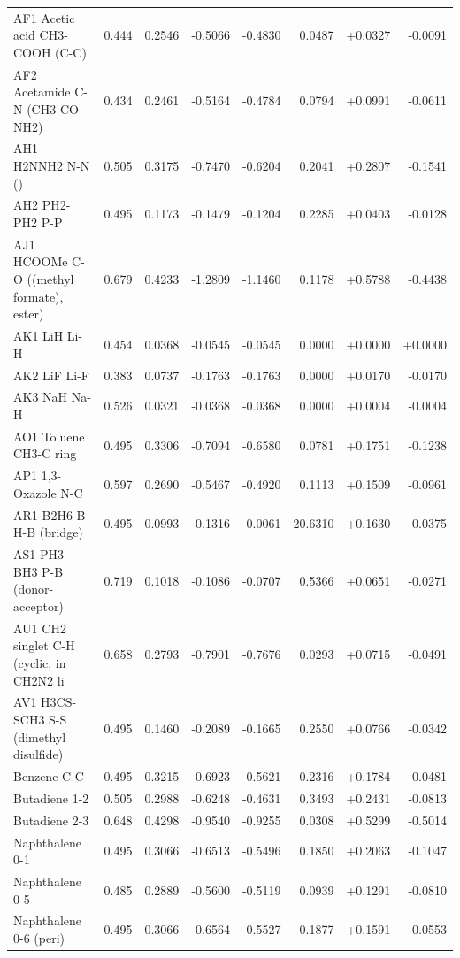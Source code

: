 \documentclass[11pt,a4paper]{article}
\begin{document}
\begin{longtable}{p{4.5cm}rrrrrrr}
AF1 Acetic acid CH3-COOH (C-C) & 0.444 & 0.2546 & -0.5066 & -0.4830 & 0.0487 & +0.0327 & -0.0091\\
AF2 Acetamide C-N (CH3-CO-NH2) & 0.434 & 0.2461 & -0.5164 & -0.4784 & 0.0794 & +0.0991 & -0.0611\\
AH1 H2NNH2 N-N () & 0.505 & 0.3175 & -0.7470 & -0.6204 & 0.2041 & +0.2807 & -0.1541\\
AH2 PH2-PH2 P-P & 0.495 & 0.1173 & -0.1479 & -0.1204 & 0.2285 & +0.0403 & -0.0128\\
AJ1 HCOOMe C-O ((methyl formate), ester) & 0.679 & 0.4233 & -1.2809 & -1.1460 & 0.1178 & +0.5788 & -0.4438\\
AK1 LiH Li-H & 0.454 & 0.0368 & -0.0545 & -0.0545 & 0.0000 & +0.0000 & +0.0000\\
AK2 LiF Li-F & 0.383 & 0.0737 & -0.1763 & -0.1763 & 0.0000 & +0.0170 & -0.0170\\
AK3 NaH Na-H & 0.526 & 0.0321 & -0.0368 & -0.0368 & 0.0000 & +0.0004 & -0.0004\\
AO1 Toluene CH3-C ring & 0.495 & 0.3306 & -0.7094 & -0.6580 & 0.0781 & +0.1751 & -0.1238\\
AP1 1,3-Oxazole N-C & 0.597 & 0.2690 & -0.5467 & -0.4920 & 0.1113 & +0.1509 & -0.0961\\
AR1 B2H6 B-H-B (bridge) & 0.495 & 0.0993 & -0.1316 & -0.0061 & 20.6310 & +0.1630 & -0.0375\\
AS1 PH3-BH3 P-B (donor-acceptor) & 0.719 & 0.1018 & -0.1086 & -0.0707 & 0.5366 & +0.0651 & -0.0271\\
AU1 CH2 singlet C-H (cyclic, in CH2N2 li & 0.658 & 0.2793 & -0.7901 & -0.7676 & 0.0293 & +0.0715 & -0.0491\\
AV1 H3CS-SCH3 S-S (dimethyl disulfide) & 0.495 & 0.1460 & -0.2089 & -0.1665 & 0.2550 & +0.0766 & -0.0342\\
Benzene C-C & 0.495 & 0.3215 & -0.6923 & -0.5621 & 0.2316 & +0.1784 & -0.0481\\
Butadiene 1-2 & 0.505 & 0.2988 & -0.6248 & -0.4631 & 0.3493 & +0.2431 & -0.0813\\
Butadiene 2-3 & 0.648 & 0.4298 & -0.9540 & -0.9255 & 0.0308 & +0.5299 & -0.5014\\
Naphthalene 0-1 & 0.495 & 0.3066 & -0.6513 & -0.5496 & 0.1850 & +0.2063 & -0.1047\\
Naphthalene 0-5 & 0.485 & 0.2889 & -0.5600 & -0.5119 & 0.0939 & +0.1291 & -0.0810\\
Naphthalene 0-6 (peri) & 0.495 & 0.3066 & -0.6564 & -0.5527 & 0.1877 & +0.1591 & -0.0553\\

\end{longtable}
\end{document}
